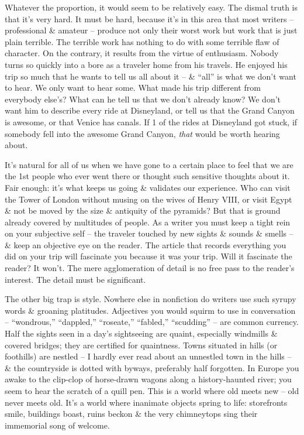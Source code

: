 \documentclass{article}
\begin{document}
Whatever the proportion, it would seem to be relatively easy. The dismal truth is that it's very hard. It must be hard, because it's in this area that most writers -- professional \& amateur -- produce not only their worst work but work that is just plain terrible. The terrible work has nothing to do with some terrible flaw of character. On the contrary, it results from the virtue of enthusiasm. Nobody turns so quickly into a bore as a traveler home from his travels. He enjoyed his trip so much that he wants to tell us all about it -- \& ``all'' is what we don't want to hear. We only want to hear some. What made his trip different from everybody else's? What can he tell us that we don't already know? We don't want him to describe every ride at Disneyland, or tell us that the Grand Canyon is awesome, or that Venice has canals. If 1 of the rides at Disneyland got stuck, if somebody fell into the awesome Grand Canyon, \textit{that} would be worth hearing about.

It's natural for all of us when we have gone to a certain place to feel that we are the 1st people who ever went there or thought such sensitive thoughts about it. Fair enough: it's what keeps us going \& validates our experience. Who can visit the Tower of London without musing on the wives of Henry VIII, or visit Egypt \& not be moved by the size \& antiquity of the pyramids? But that is ground already covered by multitudes of people. As a writer you must keep a tight rein on your subjective self -- the traveler touched by new sights \& sounds \& smells -- \& keep an objective eye on the reader. The article that records everything you did on your trip will fascinate you because it was your trip. Will it fascinate the reader? It won't. The mere agglomeration of detail is no free pass to the reader's interest. The detail must be significant.

The other big trap is style. Nowhere else in nonfiction do writers use such syrupy words \& groaning platitudes. Adjectives you would squirm to use in conversation -- ``wondrous,'' ``dappled,'' ``roseate,'' ``fabled,'' ``scudding'' -- are common currency. Half the sights seen in a day's sightseeing are quaint, especially windmills \& covered bridges; they are certified for quaintness. Towns situated in hills (or foothills) are nestled -- I hardly ever read about an unnestled town in the hills -- \& the countryside is dotted with byways, preferably half forgotten. In Europe you awake to the clip-clop of horse-drawn wagons along a history-haunted river; you seem to hear the scratch of a quill pen. This is a world where old meets new -- old never meets old. It's a world where inanimate objects spring to life: storefronts smile, buildings boast, ruins beckon \& the very chimneytops sing their immemorial song of welcome.
\end{document}

